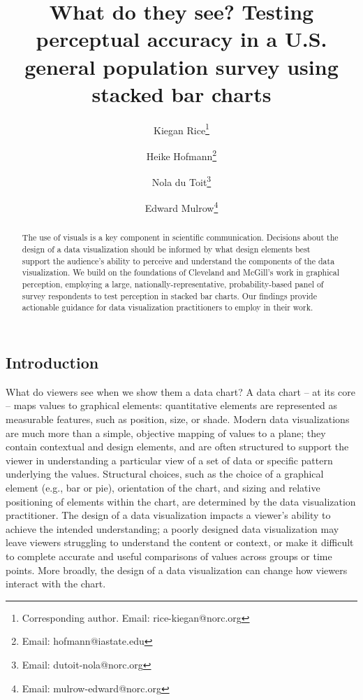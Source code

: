 \documentclass[
]{jds}
\author[1]{Kiegan Rice\thanks{Corresponding author. Email: rice-kiegan@norc.org}}
\author[2]{Heike Hofmann\footnote{Email: hofmann@iastate.edu}}
\author[1]{Nola du Toit\footnote{Email: dutoit-nola@norc.org}}
\author[1]{Edward Mulrow\footnote{Email: mulrow-edward@norc.org}}
\affil[1]{NORC at the University of Chicago}
\affil[2]{Department of Statistics, Iowa State University}
\title{What do they see? Testing perceptual accuracy in a U.S. general
population survey using stacked bar charts}
\author{}
\date{}
\begin{document}
\maketitle
\begin{abstract}
The use of visuals is a key component in scientific communication.
Decisions about the design of a data visualization should be informed by
what design elements best support the audience's ability to perceive and
understand the components of the data visualization. We build on the
foundations of Cleveland and McGill's work in graphical perception,
employing a large, nationally-representative, probability-based panel of
survey respondents to test perception in stacked bar charts. Our
findings provide actionable guidance for data visualization
practitioners to employ in their work.
\end{abstract}
\ifdefined\Shaded\renewenvironment{Shaded}{\begin{tcolorbox}[frame hidden, enhanced, boxrule=0pt, sharp corners, borderline west={3pt}{0pt}{shadecolor}, interior hidden, breakable]}{\end{tcolorbox}}\fi


  \newcommand{\blandscape}{\begin{landscape}} 
  \newcommand{\elandscape}{\end{landscape}}

  \setlength{\parindent}{0pt}
  \singlespacing

\hypertarget{introduction}{%
\subsection{Introduction}\label{introduction}}

What do viewers see when we show them a data chart? A data chart -- at
its core -- maps values to graphical elements: quantitative elements are
represented as measurable features, such as position, size, or shade.
Modern data visualizations are much more than a simple, objective
mapping of values to a plane; they contain contextual and design
elements, and are often structured to support the viewer in
understanding a particular view of a set of data or specific pattern
underlying the values. Structural choices, such as the choice of a
graphical element (e.g., bar or pie), orientation of the chart, and
sizing and relative positioning of elements within the chart, are
determined by the data visualization practitioner. The design of a data
visualization impacts a viewer's ability to achieve the intended
understanding; a poorly designed data visualization may leave viewers
struggling to understand the content or context, or make it difficult to
complete accurate and useful comparisons of values across groups or time
points. More broadly, the design of a data visualization can change how
viewers interact with the chart.
\end{document}

